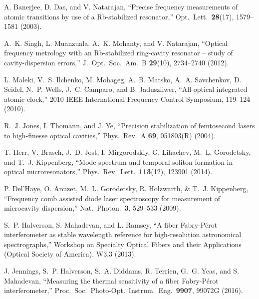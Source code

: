 \documentclass[10pt]{article}
\begin{document}
\begin{thebibliography}{21}
  A. Banerjee, D. Das, and V. Natarajan, ``Precise frequency measurements of atomic transitions by use of a Rb-stabilized resonator,'' Opt.\ Lett.\ {\bf 28}(17), 1579--1581 (2003). 
  
  A.~K. Singh, L. Muanzuala, A.~K. Mohanty, and V. Natarajan, ``Optical frequency metrology with an Rb-stabilized ring-cavity resonator -- study of cavity-dispersion errors,'' J.\ Opt.\ Soc.\ Am.\ B {\bf 29}(10), 2734--2740 (2012).  

  L. Maleki, V.~S. Ilchenko, M. Mohageg, A.~B. Matsko, A.~A. Savchenkov, D. Seidel, N.~P. Wells, J.~C. Camparo, and B. Jaduszliwer, ``All-optical integrated atomic clock,'' 2010 IEEE International Frequency Control Symposium, 119--124 (2010).
  
  R.~J. Jones, I. Thomann, and J. Ye, ``Precision stabilization of femtosecond lasers to high-finesse optical cavities,'' Phys.\ Rev.\ A {\bf 69}, 051803(R) (2004).
  
  T. Herr, V. Brasch, J.~D. Jost, I. Mirgorodskiy, G. Lihachev, M.~L. Gorodetsky, and  T.~J. Kippenberg, ``Mode spectrum and temporal soliton formation in optical microresonators,'' Phys.\ Rev.\ Lett.\ {\bf 113}(12), 123901 (2014).

 P. Del'Haye, O. Arcizet, M.~L. Gorodetsky, R. Holzwarth, \&
   T.~J. Kippenberg, ``Frequency comb assisted diode laser spectroscopy for measurement of microcavity dispersion,'' Nat.\ Photon.\ {\bf 3}, 529--533 (2009).

  S.~P. Halverson, S. Mahadevan, and L. Ramsey, ``A fiber Fabry-P{\'e}rot interferometer as stable wavelength reference for high-resolution astronomical spectrographs,'' Workshop on Specialty Optical Fibers and their Applications (Optical Society of America), W3.3 (2013).

  J. Jennings, S.~P. Halverson, S.~A. Diddams, R. Terrien, G.~G. Ycas, and S. Mahadevan, ``Measuring the thermal sensitivity of a fiber Fabry-P{\'e}rot interferometer,'' Proc.\ Soc.\ Photo-Opt.\ Instrum.\ Eng.\ {\bf 9907}, 99072G (2016).

 \end{thebibliography}
\end{document}
